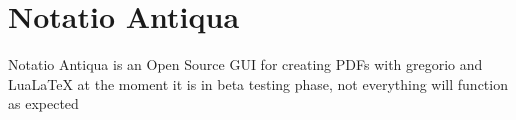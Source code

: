 \chapter{Notatio Antiqua}
\hypertarget{index}{}\label{index}
Notatio Antiqua is an Open Source GUI for creating PDFs with gregorio and Lua\+La\+TeX at the moment it is in beta testing phase, not everything will function as expected 
